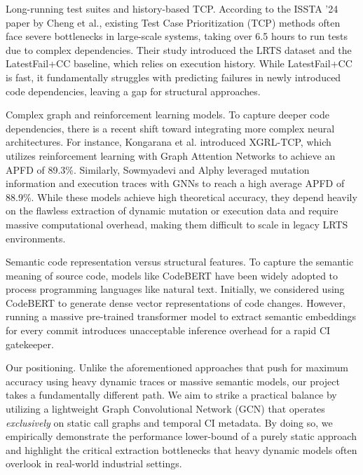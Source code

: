 Long-running test suites and history-based TCP. According to the ISSTA '24 paper by Cheng et al., existing Test Case Prioritization (TCP) methods often face severe bottlenecks in large-scale systems, taking over 6.5 hours to run tests due to complex dependencies. Their study introduced the LRTS dataset and the LatestFail+CC baseline, which relies on execution history. While LatestFail+CC is fast, it fundamentally struggles with predicting failures in newly introduced code dependencies, leaving a gap for structural approaches.

Complex graph and reinforcement learning models. To capture deeper code dependencies, there is a recent shift toward integrating more complex neural architectures. For instance, Kongarana et al. introduced XGRL-TCP, which utilizes reinforcement learning with Graph Attention Networks to achieve an APFD of 89.3\%. Similarly, Sowmyadevi and Alphy leveraged mutation information and execution traces with GNNs to reach a high average APFD of 88.9\%. While these models achieve high theoretical accuracy, they depend heavily on the flawless extraction of dynamic mutation or execution data and require massive computational overhead, making them difficult to scale in legacy LRTS environments.

Semantic code representation versus structural features. To capture the semantic meaning of source code, models like CodeBERT have been widely adopted to process programming languages like natural text. Initially, we considered using CodeBERT to generate dense vector representations of code changes. However, running a massive pre-trained transformer model to extract semantic embeddings for every commit introduces unacceptable inference overhead for a rapid CI gatekeeper. 

Our positioning. Unlike the aforementioned approaches that push for maximum accuracy using heavy dynamic traces or massive semantic models, our project takes a fundamentally different path. We aim to strike a practical balance by utilizing a lightweight Graph Convolutional Network (GCN) that operates \textit{exclusively} on static call graphs and temporal CI metadata. By doing so, we empirically demonstrate the performance lower-bound of a purely static approach and highlight the critical extraction bottlenecks that heavy dynamic models often overlook in real-world industrial settings.
